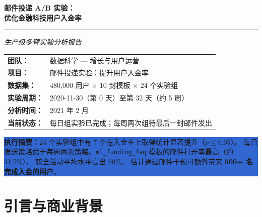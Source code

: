 \documentclass[12pt,a4paper]{ctexart}
\begin{document}
\begin{titlepage}
  \centering
  \vspace*{1.5cm}

  {\LARGE\bfseries\color{navy}
    邮件投递 A/B 实验：\\[0.4em]
    优化金融科技用户入金率
  }

  \vspace{1cm}
  \rule{\linewidth}{1.5pt}
  \vspace{0.5cm}

  {\large\textit{生产级多臂实验分析报告}}

  \vspace{1.5cm}

  \begin{tabular}{ll}
    \textbf{团队：}     & 数据科学 — 增长与用户运营 \\
    \textbf{项目：}     & 邮件投递实验：提升用户入金率 \\
    \textbf{数据集：}   & 480,000 用户 $\times$ 10 封模板 $\times$ 24 个实验组 \\
    \textbf{实验周期：} & 2020-11-30（第 0 天）至第 32 天（约 5 周） \\
    \textbf{分析时间：} & 2021 年 2 月 \\
    \textbf{当前状态：} & 每日组实验已完成；每周两次组待最后一封邮件发出 \\
  \end{tabular}

  \vspace{2cm}

  \colorbox{highlight}{%
    \parbox{0.85\textwidth}{%
      \centering
      \textbf{执行摘要：}24 个实验组中有 7 个在入金率上取得统计显著提升（$p \leq 0.05$）。
      每日发送策略优于每周两次策略。\texttt{ml\_funding\_faq} 模板的邮件打开率最高（约 31.5\%），
      较全活动平均水平高出 60\%。
      估计通过邮件干预可额外带来 \textbf{500+ 名完成入金的用户}。
    }
  }

  \vfill

\end{titlepage}

\tableofcontents
\clearpage

\section{引言与商业背景}
\end{document}
